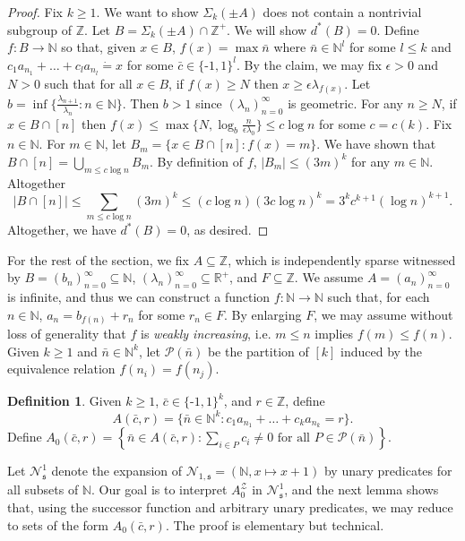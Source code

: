 \documentclass{amsart}
\def\seq{\subseteq}
\newcommand{\nv}{\text{-}}
\newcommand{\cbar}{\bar{c}}
\newcommand{\nbar}{\bar{n}}
\newcommand{\ms}{\mathfrak{s}}
\newcommand{\de}{\mathbin{\dot{=}}}
\newcommand{\cN}{\mathcal{N}}
\newcommand{\cP}{\mathcal{P}}
\newcommand{\cZ}{\mathcal{Z}}
\def\N{\mathbb N}
\def\R{\mathbb R}
\def\Z{\mathbb Z}
\theoremstyle{definition}
\newtheorem{definition}[theorem]{Definition}
\begin{document}
\begin{proof}
Fix $k\geq 1$. We want to show $\Sigma_k(\pm A)$ does not contain a nontrivial subgroup of $\Z$. Let $B=\Sigma_k(\pm A)\cap\Z^+$. We will show $d^*(B)=0$.  Define $f\colon B\to\N$ so that, given $x\in B$, $f(x)=\max\nbar$ where $\nbar\in \N^l$ for some $l\leq k$ and $c_1a_{n_1}+\ldots+c_la_{n_l}\de x$ for some $\cbar\in\{\nv 1,1\}^l$. By the claim, we may fix $\epsilon>0$ and $N>0$ such that for all $x\in B$, if $f(x)\geq N$ then $x\geq \epsilon\lambda_{f(x)}$. Let $b=\inf\{\frac{\lambda_{n+1}}{\lambda_n}:n\in\N\}$. Then $b>1$ since $(\lambda_n)_{n=0}^\infty$ is geometric. For any $n\geq N$, if $x\in B\cap[n]$ then $f(x)\leq \max\{N,\log_b\frac{n}{\epsilon\lambda_0}\}\leq c\log n$ for some $c=c(k)$. Fix $n\in\N$. For $m\in \N$, let $B_m=\{x\in B\cap[n]:f(x)=m\}$. We have shown that $B\cap [n]=\bigcup_{m\leq c\log n}B_m$. By definition of $f$, $|B_m|\leq (3m)^k$ for any $m\in\N$. Altogether 
\[
|B\cap [n]|\leq\sum_{m\leq c\log n}(3m)^k\leq (c\log n)(3c\log n)^k=3^kc^{k+1}(\log n)^{k+1}.
\]
Altogether, we have  $d^*(B)=0$, as desired.
\end{proof}




For the rest of the section, we fix $A\seq\Z$, which is independently sparse witnessed by $B=(b_n)_{n=0}^\infty\seq\N$, $(\lambda_n)_{n=0}^\infty\seq\R^+$, and $F\seq\Z$. We assume $A=(a_n)_{n=0}^\infty$ is infinite, and thus we can construct a function $f\colon \N\to\N$ such that, for each $n\in\N$, $a_n=b_{f(n)}+r_n$ for some $r_n\in F$. By enlarging $F$, we may assume without loss of generality that $f$ is \emph{weakly increasing}, i.e. $m\leq n$ implies $f(m)\leq f(n)$. Given $k\geq 1$ and $\nbar\in\N^k$, let $\cP(\nbar)$ be the partition of $[k]$ induced by the equivalence relation $f(n_i)=f(n_j)$. 

\begin{definition}
Given $k\geq 1$, $\cbar\in\{\nv 1,1\}^k$, and $r\in\Z$, define
\[
A(\cbar,r)=\{\nbar\in\N^k:c_1a_{n_1}+\ldots+c_ka_{n_k}=r\}.
\]
Define $A_0(\cbar,r)=\left\{\nbar\in A(\cbar,r):\sum_{i\in P}c_i\neq 0\text{ for all }P\in\cP(\nbar)\right\}$.
\end{definition}

Let $\cN^1_{\ms}$ denote the expansion of $\cN_{1,\ms}=(\N,x\mapsto x+1)$ by unary predicates for all subsets of $\N$. Our goal is to interpret $A^{\cZ}_0$ in $\cN^1_{\ms}$, and the next lemma shows that, using the successor function and arbitrary unary predicates, we may reduce to sets of the form $A_0(\cbar,r)$. The proof is elementary but technical. 
\end{document}
